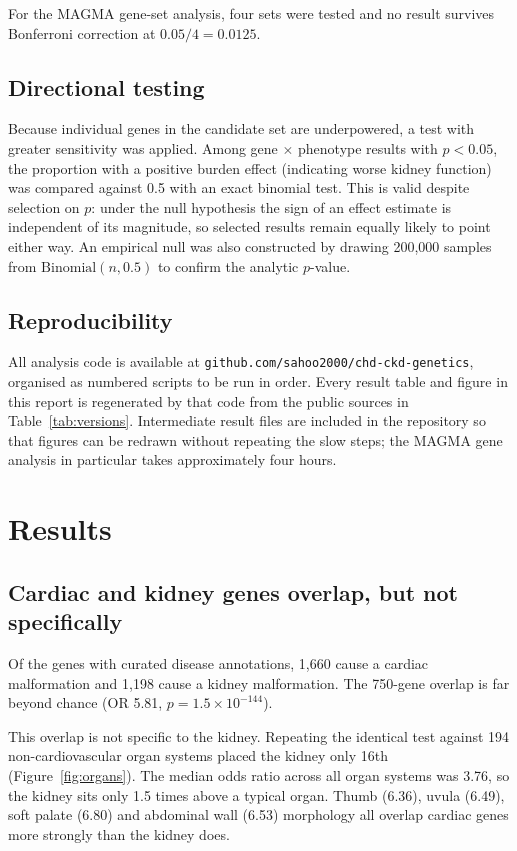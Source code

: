 \documentclass[11pt,a4paper]{article}
\begin{document}
For the MAGMA gene-set analysis, four sets were tested and no result survives Bonferroni
correction at $0.05/4 = 0.0125$.

\subsection{Directional testing}

Because individual genes in the candidate set are underpowered, a test with greater
sensitivity was applied. Among gene $\times$ phenotype results with $p < 0.05$, the
proportion with a positive burden effect (indicating worse kidney function) was compared
against 0.5 with an exact binomial test. This is valid despite selection on $p$: under the
null hypothesis the sign of an effect estimate is independent of its magnitude, so selected
results remain equally likely to point either way. An empirical null was also constructed by
drawing 200,000 samples from $\mathrm{Binomial}(n, 0.5)$ to confirm the analytic $p$-value.

\subsection{Reproducibility}

All analysis code is available at \texttt{github.com/sahoo2000/chd-ckd-genetics}, organised
as numbered scripts to be run in order. Every result table and figure in this report is
regenerated by that code from the public sources in Table~\ref{tab:versions}. Intermediate
result files are included in the repository so that figures can be redrawn without
repeating the slow steps; the MAGMA gene analysis in particular takes approximately four
hours.

\section{Results}

\subsection{Cardiac and kidney genes overlap, but not specifically}

Of the genes with curated disease annotations, 1,660 cause a cardiac malformation and 1,198
cause a kidney malformation. The 750-gene overlap is far beyond chance (OR 5.81,
$p = 1.5 \times 10^{-144}$).

This overlap is not specific to the kidney. Repeating the identical test against 194
non-cardiovascular organ systems placed the kidney only 16th (Figure~\ref{fig:organs}). The
median odds ratio across all organ systems was 3.76, so the kidney sits only 1.5 times above
a typical organ. Thumb (6.36), uvula (6.49), soft palate (6.80) and abdominal wall (6.53)
morphology all overlap cardiac genes more strongly than the kidney does.
\end{document}
